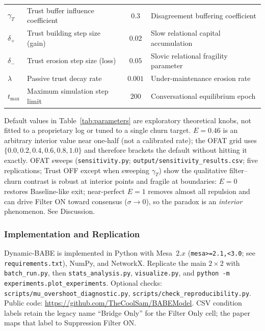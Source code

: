 \begin{table}[htbp]
\begin{tabular}{p{2.8cm} p{5.5cm} c p{6cm}}
$\gamma_T$ & Trust buffer influence coefficient & $0.3$ & Disagreement buffering coefficient \\
$\delta_+$ & Trust building step size (gain) & $0.02$ & Slow relational capital accumulation \\
$\delta_-$ & Trust erosion step size (loss) & $0.05$ & Slovic relational fragility parameter \\
$\lambda$ & Passive trust decay rate & $0.001$ & Under-maintenance erosion rate \\
$t_{\max}$ & Maximum simulation step limit & $200$ & Conversational equilibrium epoch \\
\bottomrule
\end{tabular}
\end{table}

Default values in Table~\ref{tab:parameters} are exploratory theoretical knobs, not fitted to a proprietary log or tuned to a single churn target. $E=0.46$ is an arbitrary interior value near one-half (not a calibrated rate); the OFAT grid uses $\{0.0, 0.2, 0.4, 0.6, 0.8, 1.0\}$ and therefore brackets the default without hitting it exactly. OFAT sweeps (\texttt{sensitivity.py}; \texttt{output/sensitivity\_results.csv}; five replications; Trust OFF except when sweeping $\gamma_T$) show the qualitative filter--churn contrast is robust at interior points and fragile at boundaries: $E=0$ restores Baseline-like exit; near-perfect $E=1$ removes almost all repulsion and can drive Filter ON toward consensus ($\sigma\to 0$), so the paradox is an \emph{interior} phenomenon. See Discussion.

\subsubsection{Implementation and Replication}
Dynamic-BABE is implemented in Python with Mesa~$2.x$ (\texttt{mesa>=2.1,<3.0}; see \texttt{requirements.txt}), NumPy, and NetworkX. Replicate the main $2\times2$ with \texttt{batch\_run.py}, then \texttt{stats\_analysis.py}, \texttt{visualize.py}, and \texttt{python -m experiments.plot\_experiments}. Optional checks: \texttt{scripts/mu\_overshoot\_diagnostic.py}, \texttt{scripts/check\_reproducibility.py}. Public code: \url{https://github.com/TheCoolSam/BABEModel}. CSV condition labels retain the legacy name ``Bridge Only'' for the Filter Only cell; the paper maps that label to Suppression Filter ON.
